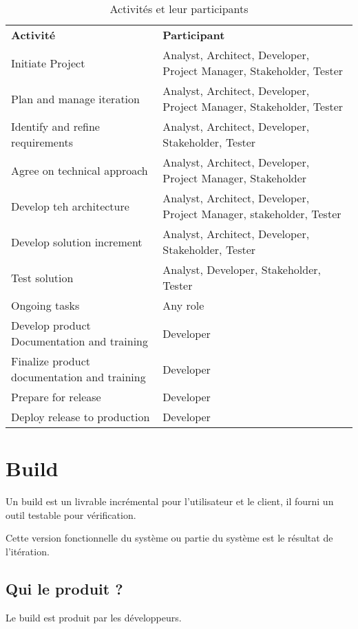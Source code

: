 \documentclass[a4paper, 11pt]{article}
\begin{document}
\begin{table}
	\begin{tabular}{p{5cm} |p{11cm}|}
	\textbf{Activité} & \textbf{Participant}\\
	Initiate Project & Analyst, Architect, Developer, Project Manager, Stakeholder, Tester\\
	\hline
	Plan and manage iteration &Analyst, Architect, Developer, Project Manager, Stakeholder, Tester\\
	\hline
	Identify and refine requirements &Analyst, Architect, Developer, Stakeholder, Tester\\
	\hline
	Agree on technical approach&Analyst, Architect, Developer, Project Manager, Stakeholder\\
	\hline
	Develop teh architecture&Analyst, Architect, Developer, Project Manager, stakeholder, Tester\\
	\hline
	Develop solution increment&Analyst, Architect, Developer, Stakeholder, Tester\\
	\hline
	Test solution&Analyst, Developer, Stakeholder, Tester\\
	\hline
	Ongoing tasks&Any role\\
	\hline
	Develop product Documentation and training&Developer\\
	\hline
	Finalize product documentation and training&Developer\\
	\hline
	Prepare for release&Developer\\
	\hline
	Deploy release to production&Developer\\
	\hline
\end{tabular}
\caption{Activités et leur participants}
\end{table}

\section{Build}
Un build est un livrable incrémental pour l'utilisateur et le client, il fourni un outil testable pour vérification.

Cette version fonctionnelle du système ou partie du système est le résultat de l'itération.
 
\subsection{Qui le produit ? }
Le build est produit par les développeurs.
\end{document}
